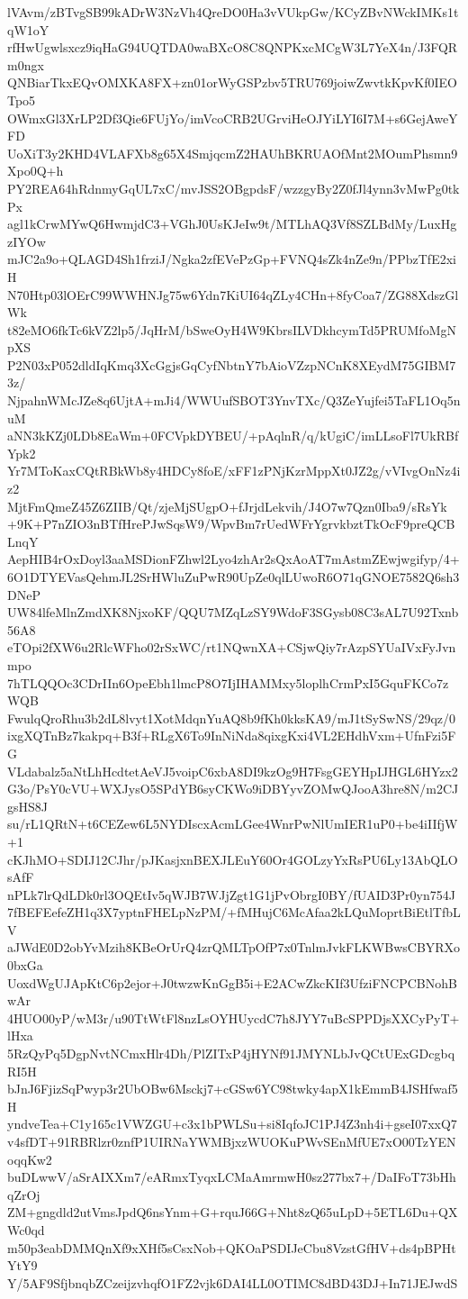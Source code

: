 lVAvm/zBTvgSB99kADrW3NzVh4QreDO0Ha3vVUkpGw/KCyZBvNWckIMKs1tqW1oY
rfHwUgwlsxcz9iqHaG94UQTDA0waBXcO8C8QNPKxcMCgW3L7YeX4n/J3FQRm0ngx
QNBiarTkxEQvOMXKA8FX+zn01orWyGSPzbv5TRU769joiwZwvtkKpvKf0IEOTpo5
OWmxGl3XrLP2Df3Qie6FUjYo/imVcoCRB2UGrviHeOJYiLYI6I7M+s6GejAweYFD
UoXiT3y2KHD4VLAFXb8g65X4SmjqcmZ2HAUhBKRUAOfMnt2MOumPhsmn9Xpo0Q+h
PY2REA64hRdnmyGqUL7xC/mvJSS2OBgpdsF/wzzgyBy2Z0fJl4ynn3vMwPg0tkPx
agl1kCrwMYwQ6HwmjdC3+VGhJ0UsKJeIw9t/MTLhAQ3Vf8SZLBdMy/LuxHgzIYOw
mJC2a9o+QLAGD4Sh1frziJ/Ngka2zfEVePzGp+FVNQ4sZk4nZe9n/PPbzTfE2xiH
N70Htp03lOErC99WWHNJg75w6Ydn7KiUI64qZLy4CHn+8fyCoa7/ZG88XdszGlWk
t82eMO6fkTc6kVZ2lp5/JqHrM/bSweOyH4W9KbrsILVDkhcymTd5PRUMfoMgNpXS
P2N03xP052dldIqKmq3XcGgjsGqCyfNbtnY7bAioVZzpNCnK8XEydM75GIBM73z/
NjpahnWMcJZe8q6UjtA+mJi4/WWUufSBOT3YnvTXc/Q3ZeYujfei5TaFL1Oq5nuM
aNN3kKZj0LDb8EaWm+0FCVpkDYBEU/+pAqlnR/q/kUgiC/imLLsoFl7UkRBfYpk2
Yr7MToKaxCQtRBkWb8y4HDCy8foE/xFF1zPNjKzrMppXt0JZ2g/vVIvgOnNz4iz2
MjtFmQmeZ45Z6ZIIB/Qt/zjeMjSUgpO+fJrjdLekvih/J4O7w7Qzn0Iba9/sRsYk
+9K+P7nZIO3nBTfHrePJwSqsW9/WpvBm7rUedWFrYgrvkbztTkOcF9preQCBLnqY
AepHIB4rOxDoyl3aaMSDionFZhwl2Lyo4zhAr2sQxAoAT7mAstmZEwjwgifyp/4+
6O1DTYEVasQehmJL2SrHWluZuPwR90UpZe0qlLUwoR6O71qGNOE7582Q6sh3DNeP
UW84lfeMlnZmdXK8NjxoKF/QQU7MZqLzSY9WdoF3SGysb08C3sAL7U92Txnb56A8
eTOpi2fXW6u2RlcWFho02rSxWC/rt1NQwnXA+CSjwQiy7rAzpSYUaIVxFyJvnmpo
7hTLQQOc3CDrIIn6OpeEbh1lmcP8O7IjIHAMMxy5loplhCrmPxI5GquFKCo7zWQB
FwulqQroRhu3b2dL8lvyt1XotMdqnYuAQ8b9fKh0kksKA9/mJ1tSySwNS/29qz/0
ixgXQTnBz7kakpq+B3f+RLgX6To9InNiNda8qixgKxi4VL2EHdhVxm+UfnFzi5FG
VLdabalz5aNtLhHcdtetAeVJ5voipC6xbA8DI9kzOg9H7FsgGEYHpIJHGL6HYzx2
G3o/PsY0cVU+WXJysO5SPdYB6syCKWo9iDBYyvZOMwQJooA3hre8N/m2CJgsHS8J
su/rL1QRtN+t6CEZew6L5NYDIscxAcmLGee4WnrPwNlUmIER1uP0+be4iIIfjW+1
cKJhMO+SDIJ12CJhr/pJKasjxnBEXJLEuY60Or4GOLzyYxRsPU6Ly13AbQLOsAfF
nPLk7lrQdLDk0rl3OQEtIv5qWJB7WJjZgt1G1jPvObrgI0BY/fUAID3Pr0yn754J
7fBEFEefeZH1q3X7yptnFHELpNzPM/+fMHujC6McAfaa2kLQuMoprtBiEtlTfbLV
aJWdE0D2obYvMzih8KBeOrUrQ4zrQMLTpOfP7x0TnlmJvkFLKWBwsCBYRXo0bxGa
UoxdWgUJApKtC6p2ejor+J0twzwKnGgB5i+E2ACwZkcKIf3UfziFNCPCBNohBwAr
4HUO00yP/wM3r/u90TtWtFl8nzLsOYHUycdC7h8JYY7uBcSPPDjsXXCyPyT+lHxa
5RzQyPq5DgpNvtNCmxHlr4Dh/PlZITxP4jHYNf91JMYNLbJvQCtUExGDcgbqRI5H
bJnJ6FjizSqPwyp3r2UbOBw6Msckj7+cGSw6YC98twky4apX1kEmmB4JSHfwaf5H
yndveTea+C1y165c1VWZGU+c3x1bPWLSu+si8IqfoJC1PJ4Z3nh4i+gseI07xxQ7
v4sfDT+91RBRlzr0znfP1UIRNaYWMBjxzWUOKuPWvSEnMfUE7xO00TzYENoqqKw2
buDLwwV/aSrAIXXm7/eARmxTyqxLCMaAmrmwH0sz277bx7+/DaIFoT73bHhqZrOj
ZM+gngdld2utVmsJpdQ6nsYnm+G+rquJ66G+Nht8zQ65uLpD+5ETL6Du+QXWc0qd
m50p3eabDMMQnXf9xXHf5sCsxNob+QKOaPSDIJeCbu8VzstGfHV+ds4pBPHtYtY9
Y/5AF9SfjbnqbZCzeijzvhqfO1FZ2vjk6DAI4LL0OTIMC8dBD43DJ+In71JEJwdS
